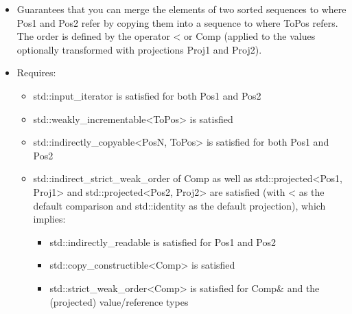 
\begin{itemize}
\item
Guarantees that you can merge the elements of two sorted sequences to where Pos1 and Pos2 refer by copying them into a sequence to where ToPos refers. The order is defined by the operator < or Comp (applied to the values optionally transformed with projections Proj1 and Proj2).

\item
Requires:
\begin{itemize}
\item
std::input\_iterator is satisfied for both Pos1 and Pos2

\item
std::weakly\_incrementable<ToPos> is satisfied

\item
std::indirectly\_copyable<PosN, ToPos> is satisfied for both Pos1 and Pos2

\item
std::indirect\_strict\_weak\_order of Comp as well as std::projected<Pos1, Proj1> and std::projected<Pos2, Proj2> are satisfied (with < as the default comparison and std::identity as the default projection), which implies:

\begin{itemize}
\item
std::indirectly\_readable is satisfied for Pos1 and Pos2

\item
std::copy\_constructible<Comp> is satisfied

\item
std::strict\_weak\_order<Comp> is satisfied for Comp\& and the (projected) value/reference types
\end{itemize}
\end{itemize}
\end{itemize}


